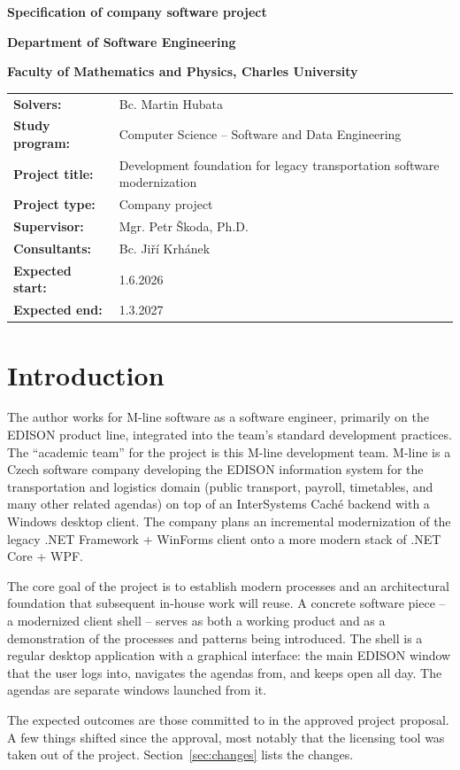 \documentclass{article}
\title{\ProjectTitle}
\author{\StudentsFullName}
\def\CompanyProject{Company project}
\def\StudentsFullName{Bc. Martin Hubata}
\def\StudyProgram{Computer Science -- Software and Data Engineering}
\def\ProjectTitle{Development foundation for legacy transportation software modernization}
\def\ProjectType{\CompanyProject}
\def\SupervisorFullName{Mgr. Petr Škoda, Ph.D.}
\def\ConsultantsFullName{Bc. Jiří Krhánek}
\def\ExpectedStart{1.6.2026}
\def\ExpectedEnd{1.3.2027}
\begin{document}
\centerline{\Large \textbf{Specification of company software project}}
\centerline{ \textbf{Department of Software Engineering}}
\centerline{ \textbf{Faculty of Mathematics and Physics, Charles University}}
\bigskip
{\noindent\begin{tabular*}{\textwidth}{ >{\raggedleft}m{4cm} l}
 \textbf{Solvers:} & \StudentsFullName \\
 \textbf{Study program:} & \StudyProgram \\[1em]
 \textbf{Project title:} & \ProjectTitle \\
 \textbf{Project type:} & \ProjectType \\[1em]
 \textbf{Supervisor:} & \SupervisorFullName \\
 \textbf{Consultants:} & \ConsultantsFullName \\[1em]
 \textbf{Expected start:} & \ExpectedStart \\
 \textbf{Expected end:} & \ExpectedEnd \\
\end{tabular*}}

\section{Introduction}

The author works for M-line software as a software engineer, primarily on the EDISON product line, integrated into the team's standard development practices. The ``academic team'' for the project is this M-line development team. M-line is a Czech software company developing the EDISON information system for the transportation and logistics domain (public transport, payroll, timetables, and many other related agendas) on top of an InterSystems Caché backend with a Windows desktop client. The company plans an incremental modernization of the legacy .NET Framework + WinForms client onto a more modern stack of .NET Core + WPF.

The core goal of the project is to establish modern processes and an architectural foundation that subsequent in-house work will reuse. A concrete software piece -- a modernized client shell -- serves as both a working product and as a demonstration of the processes and patterns being introduced. The shell is a regular desktop application with a graphical interface: the main EDISON window that the user logs into, navigates the agendas from, and keeps open all day. The agendas are separate windows launched from it.

\medskip
\noindent The expected outcomes are those committed to in the approved project proposal. A few things shifted since the approval, most notably that the licensing tool was taken out of the project. Section~\ref{sec:changes} lists the changes.
\end{document}
